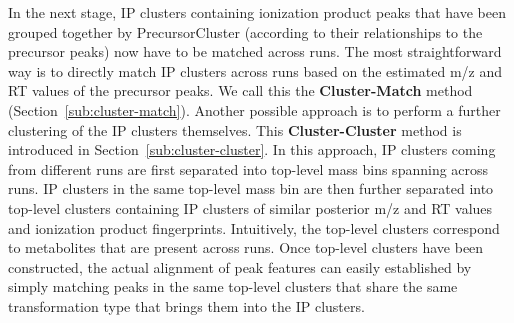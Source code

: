 In the next stage, IP clusters containing ionization product peaks that have been grouped together by PrecursorCluster (according to their relationships to the precursor peaks) now have to be matched across runs. The most straightforward way is to directly match IP clusters across runs based on the estimated m/z and RT values of the precursor peaks. We call this the \textbf{Cluster-Match} method (Section~\ref{sub:cluster-match}). Another possible approach is to perform a further clustering of the IP clusters themselves. This \textbf{Cluster-Cluster} method is introduced in Section~\ref{sub:cluster-cluster}. In this approach, IP clusters coming from different runs are first separated into top-level mass bins spanning across runs. IP clusters in the same top-level mass bin are then further separated into top-level clusters containing IP clusters of similar posterior m/z and RT values and ionization product fingerprints. Intuitively, the top-level clusters correspond to metabolites that are present across runs. Once top-level clusters have been constructed, the actual alignment of peak features can easily established by simply matching peaks in the same top-level clusters that share the same transformation type that brings them into the IP clusters.

